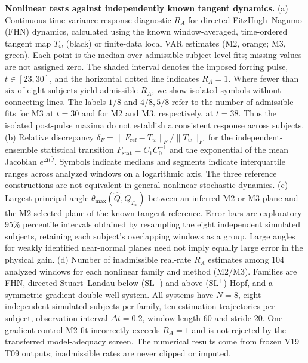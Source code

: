 \caption{\textbf{Nonlinear tests against independently known tangent dynamics.}
(a) Continuous-time variance-response diagnostic $R_A$ for directed FitzHugh--Nagumo (FHN) dynamics, calculated using the known window-averaged, time-ordered tangent map $T_w$ (black) or finite-data local VAR estimates (M2, orange; M3, green). Each point is the median over admissible subject-level fits; missing values are not assigned zero. The shaded interval denotes the imposed forcing pulse, $t\in[23,30]$, and the horizontal dotted line indicates $R_A=1$. Where fewer than six of eight subjects yield admissible $R_A$, we show isolated symbols without connecting lines. The labels $1/8$ and $4/8,5/8$ refer to the number of admissible fits for M3 at $t=30$ and for M2 and M3, respectively, at $t=38$. Thus the isolated post-pulse maxima do not establish a consistent response across subjects.
(b) Relative discrepancy $\delta_F=\lVert F_{\mathrm{ref}}-T_w\rVert_F/\lVert T_w\rVert_F$ for the independent-ensemble statistical transition $F_{\mathrm{stat}}=C_1C_0^{-1}$ and the exponential of the mean Jacobian $e^{\Delta t\bar J}$. Symbols indicate medians and segments indicate interquartile ranges across analyzed windows on a logarithmic axis. The three reference constructions are not equivalent in general nonlinear stochastic dynamics.
(c) Largest principal angle $\theta_{\max}(\widehat Q,Q_{T_w})$ between an inferred M2 or M3 plane and the M2-selected plane of the known tangent reference. Error bars are exploratory 95\% percentile intervals obtained by resampling the eight independent simulated subjects, retaining each subject's overlapping windows as a group. Large angles for weakly identified near-normal planes need not imply equally large error in the physical gain.
(d) Number of inadmissible real-rate $R_A$ estimates among 104 analyzed windows for each nonlinear family and method (M2/M3). Families are FHN, directed Stuart--Landau below ($\mathrm{SL}^{-}$) and above ($\mathrm{SL}^{+}$) Hopf, and a symmetric-gradient double-well system. All systems have $N=8$, eight independent simulated subjects per family, ten estimation trajectories per subject, observation interval $\Delta t=0.2$, window length 60 and stride 20. One gradient-control M2 fit incorrectly exceeds $R_A=1$ and is not rejected by the transferred model-adequacy screen. The numerical results come from frozen V19 T09 outputs; inadmissible rates are never clipped or imputed.}
